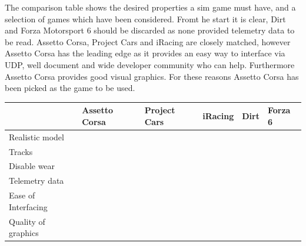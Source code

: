 The comparison table shows the desired properties a sim game must have, and a selection of games which have been considered. Fromt he start it is clear, Dirt and Forza Motorsport 6 should be discarded as none provided telemetry data to be read. Assetto Corsa, Project Cars and iRacing are closely matched, however Assetto Corsa has the leading edge as it provides an easy way to interface via UDP, well document and wide developer community who can help. Furthermore Assetto Corsa provides good visual graphics. For these reasons Assetto Corsa has been picked as the game to be used.

\begin{center}
	\begin{tabular}{ | l | l | l | l | l | l |}
		\hline
			& Assetto Corsa\cite{assestoCorsa} & Project Cars \cite{ProjectCars} & iRacing \cite{iRacing} & Dirt \cite{dirtgame} & Forza 6 \cite{forza} \\ \hline
		Realistic model	& \checkmark &\checkmark & \checkmark & \checkmark & \checkmark \\ \hline
		Tracks	& \checkmark &\checkmark & \checkmark &  & \checkmark \\ \hline
		Disable wear & \checkmark & \checkmark & \checkmark & \checkmark & \checkmark \\ \hline
		Telemetry data	& \checkmark & \checkmark & \checkmark &  &  \\ \hline
		Ease of Interfacing	& \checkmark &  & \checkmark &  &  \\ \hline
		Quality of graphics & \checkmark & \checkmark &  & \checkmark & \checkmark \\ \hline
	\end{tabular}
\end{center}

